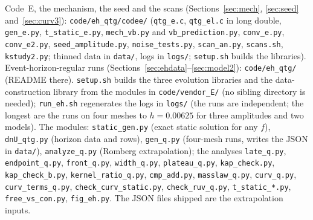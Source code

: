 \documentclass[11pt]{article}
\begin{document}
Code~E, the mechanism, the seed and the scans (Sections~\ref{sec:mech}, \ref{sec:seed} and~\ref{sec:curv3}): \texttt{code/eh\_qtg/codee/} (\texttt{qtg\_e.c}, \texttt{qtg\_el.c} in long double, \texttt{gen\_e.py}, \texttt{t\_static\_e.py}, \texttt{mech\_vb.py} and \texttt{vb\_prediction.py}, \texttt{conv\_e.py}, \texttt{conv\_e2.py}, \texttt{seed\_amplitude.py}, \texttt{noise\_tests.py}, \texttt{scan\_an.py}, \texttt{scans.sh}, \texttt{kstudy2.py}; thinned data in \texttt{data/}, logs in \texttt{logs/}; \texttt{setup.sh} builds the libraries).
Event-horizon-regular runs (Sections~\ref{sec:ehdata}--\ref{sec:model2}): \texttt{code/eh\_qtg/} (README there). \texttt{setup.sh} builds the three evolution libraries and the data-construction library from the modules in \texttt{code/vendor\_E/} (no sibling directory is needed); \texttt{run\_eh.sh} regenerates the logs in \texttt{logs/} (the runs are independent; the longest are the runs on four meshes to $h=0.00625$ for three amplitudes and two models). The modules: \texttt{static\_gen.py} (exact static solution for any $f$), \texttt{dnU\_qtg.py} (horizon data and rows), \texttt{gen\_q.py} (four-mesh runs, writes the JSON in \texttt{data/}), \texttt{analyze\_q.py} (Romberg extrapolation); the analyses \texttt{late\_q.py}, \texttt{endpoint\_q.py}, \texttt{front\_q.py}, \texttt{width\_q.py}, \texttt{plateau\_q.py}, \texttt{kap\_check.py}, \texttt{kap\_check\_b.py}, \texttt{kernel\_ratio\_q.py}, \texttt{cmp\_add.py}, \texttt{masslaw\_q.py}, \texttt{curv\_q.py}, \texttt{curv\_terms\_q.py}, \texttt{check\_curv\_static.py}, \texttt{check\_ruv\_q.py}, \texttt{t\_static\_*.py}, \texttt{free\_vs\_con.py}, \texttt{fig\_eh.py}. The JSON files shipped are the extrapolation inputs.
\end{document}
